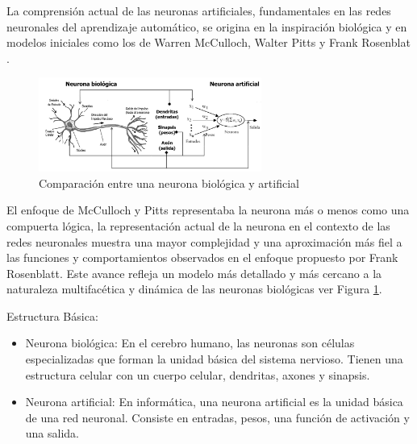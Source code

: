 La comprensión actual de las neuronas artificiales, fundamentales en las redes neuronales del aprendizaje automático, se origina en la inspiración biológica y en modelos iniciales como los de Warren McCulloch, Walter Pitts y Frank Rosenblat . 

\begin{figure}[h!]
	\centering
	\includegraphics[width=0.65\textwidth]{capitulo2/figuras/an5.png}
	\caption{Comparación entre una neurona biológica y  artificial}
	\label{fig:an5}

\end{figure}


El enfoque de McCulloch y Pitts representaba la neurona más  o menos como una compuerta lógica, la representación actual de la neurona en el contexto de las redes neuronales muestra una mayor complejidad y una aproximación más fiel a las funciones y comportamientos observados en el enfoque propuesto por Frank Rosenblatt. Este avance refleja un modelo más detallado y más cercano a la naturaleza multifacética y dinámica de las neuronas biológicas ver Figura \ref{fig:an5}.


Estructura Básica:
\begin{itemize}
	\item	 Neurona biológica: En el cerebro humano, las neuronas son células especializadas que forman la unidad básica del sistema nervioso. Tienen una estructura celular con un cuerpo celular, dendritas, axones y sinapsis.
	\item	Neurona artificial: En informática, una neurona artificial es la unidad básica de una red neuronal. Consiste en entradas, pesos, una función de activación y una salida.
\end{itemize}


